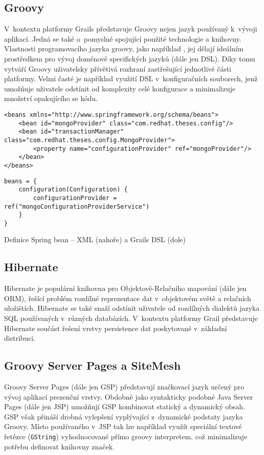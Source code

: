 \subsection{Groovy}
V~kontextu platformy Grails představuje Groovy nejen jazyk používaný k~vývoji aplikací. Jedná se také o~pomyslné  spojující použité technologie a knihovny. Vlastnosti programovacího jazyka groovy, jako například , jej dělají ideálním prostředkem pro vývoj doménově specifických jazyků (dále jen DSL).  Díky tomu vytváří Groovy uživatelsky přívětivá rozhraní zastřešující jednotlivé části platformy. Velmi časté je například využití DSL v~konfiguračních souborech, jenž umožňuje uživatele odstínit od komplexity celé konfigurace a minimalizuje množství opakujícího se kódu.
\begin{example}
\centering
\begin{lstlisting}
<beans xmlns="http://www.springframework.org/schema/beans">
    <bean id="mongoProvider" class="com.redhat.theses.config"/>
    <bean id="transactionManager" class="com.redhat.theses.config.MongoProvider">
        <property name="configurationProvider" ref="mongoProvider"/>
    </bean>
</beans>
\end{lstlisting}
\begin{lstlisting}
beans = {
    configuration(Configuration) {
        configurationProvider = ref("mongoConfigurationProviderService")
    }
}
\end{lstlisting}
\caption{Definice Spring bean -- XML (nahoře) a Grails DSL (dole)}
\end{example}

\subsection{Hibernate}
Hibernate je populární knihovna pro Objektově-Relačního mapování (dále jen ORM), řešící problém rozdílné reprezentace dat v~objektovém světě a relačních uložištích. Hibernate se také snaží odstínit uživatele od rozdílných dialektů jazyka SQL používaných v~různých databázích. V~kontextu platformy Grail představuje Hibernate součást řešení vrstvy persistence dat poskytované v~základní distribuci.

\subsection{Groovy Server Pages a SiteMesh}
Groovy Server Pages (dále jen GSP) představují značkovací jazyk určený pro vývoj aplikací prezenční vrstvy. Obdobně jako syntakticky podobné Java Server Pages (dále jen JSP) umožňují GSP kombinovat statický a dynamický obsah. GSP však přináší drobná vylepšení vyplývající z~dynamické podstaty jazyka Groovy. Místo  používaného v~JSP tak lze například využít speciální textové řetězce (\texttt{GString}) vyhodnocované přímo groovy interpretem, což minimalizuje potřebu definovat knihovny značek.

